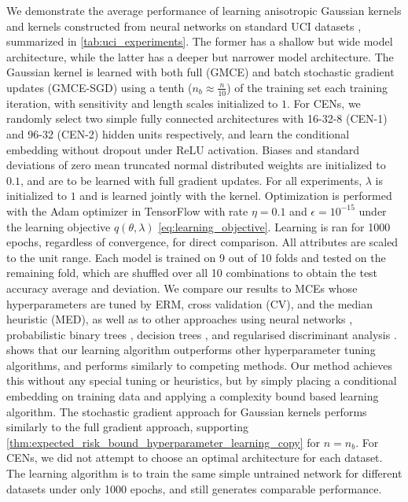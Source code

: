 \documentclass[twoside]{article}
\begin{document}
		We demonstrate the average performance of learning anisotropic Gaussian kernels and kernels constructed from neural networks on standard UCI datasets \citep{bache2013uci}, summarized in \cref{tab:uci_experiments}. The former has a shallow but wide model architecture, while the latter has a deeper but narrower model architecture. The Gaussian kernel is learned with both full (G\gls{MCE}) and batch stochastic gradient updates (G\gls{MCE}-SGD) using a tenth ($n_{b} \approx \frac{n}{10}$) of the training set each training iteration, with sensitivity and length scales initialized to $1$. For \glspl{CEN}, we randomly select two simple fully connected architectures with 16-32-8 (\gls{CEN}-1) and 96-32 (\gls{CEN}-2) hidden units respectively, and learn the conditional embedding without dropout under ReLU activation. Biases and standard deviations of zero mean truncated normal distributed weights are initialized to $0.1$, and are to be learned with full gradient updates. For all experiments, $\lambda$ is initialized to $1$ and is learned jointly with the kernel. Optimization is performed with the Adam optimizer \citep{kingma2014adam} in TensorFlow \citep{abadi2016tensorflow} with rate $\eta = 0.1$ and $\epsilon = 10^{-15}$ under the learning objective $q(\theta, \lambda)$ \eqref{eq:learning_objective}. Learning is ran for 1000 epochs, regardless of convergence, for direct comparison. All attributes are scaled to the unit range. Each model is trained on 9 out of 10 folds and tested on the remaining fold, which are shuffled over all 10 combinations to obtain the test accuracy average and deviation. We compare our results to \glspl{MCE} whose hyperparameters are tuned by \gls{ERM}, cross validation (CV), and the median heuristic (MED), as well as to other approaches using neural networks \citep[a; c]{kaya2016banknote, freire2009short}, probabilistic binary trees \citep[b]{horton1996probabilistic}, decision trees \citep[d]{zhou2004size}, and regularised discriminant analysis \citep[e]{aeberhard1992comparison}.  shows that our learning algorithm outperforms other hyperparameter tuning algorithms, and performs similarly to competing methods. Our method achieves this without any special tuning or heuristics, but by simply placing a conditional embedding on training data and applying a complexity bound based learning algorithm. The stochastic gradient approach for Gaussian kernels performs similarly to the full gradient approach, supporting \cref{thm:expected_risk_bound_hyperparameter_learning_copy} for $n = n_{b}$. For \glspl{CEN}, we did not attempt to choose an optimal architecture for each dataset. The learning algorithm is to train the same simple untrained network for different datasets under only 1000 epochs, and still generates comparable performance. 
	
\end{document}
